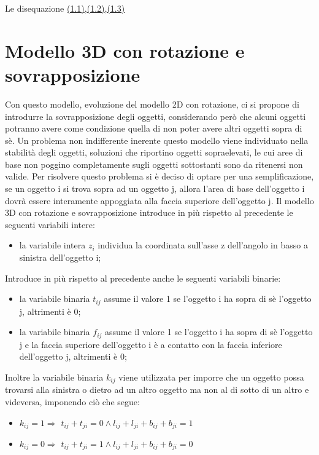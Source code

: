 Le disequazione \hyperlink{(1.1)}{(1.1)},\hyperlink{(1.2)}{(1.2)},\hyperlink{(1.3)}{(1.3)}  

\section{Modello 3D con rotazione e sovrapposizione}
Con questo modello, evoluzione del modello 2D con rotazione, ci si propone di introdurre la sovrapposizione degli oggetti, considerando però che alcuni oggetti potranno avere come condizione quella di non poter avere altri oggetti sopra di sè. Un problema non indifferente inerente questo modello viene individuato nella stabilità degli oggetti, soluzioni che riportino oggetti sopraelevati, le cui aree di base non poggino completamente sugli oggetti sottostanti sono da ritenersi non valide. Per risolvere questo problema si è deciso di optare per una semplificazione, se un oggetto i si trova sopra ad un oggetto j, allora l'area di base dell'oggetto i dovrà essere interamente appoggiata alla faccia superiore dell'oggetto j.
Il modello 3D con rotazione e sovrapposizione introduce in più rispetto al precedente le seguenti variabili intere:
\begin{itemize}
	\item la variabile intera $z_{i}$ individua la coordinata sull'asse z dell'angolo in basso a sinistra dell'oggetto i;
\end{itemize}
Introduce in più rispetto al precedente anche le seguenti variabili binarie:
\begin{itemize}
	\item la variabile binaria $t_{ij}$ assume il valore 1 se l'oggetto i ha sopra di sè l'oggetto j, altrimenti è 0;
	\item la variabile binaria $f_{ij}$ assume il valore 1 se l'oggetto i ha sopra di sè l'oggetto j e la faccia superiore dell'oggetto i è a contatto con la faccia inferiore dell'oggetto j, altrimenti è 0;
\end{itemize}
Inoltre la variabile binaria $k_{ij}$ viene utilizzata per imporre che un oggetto possa trovarsi alla sinistra o dietro ad un altro oggetto ma non al di sotto di un altro e videversa, imponendo ciò che segue:
\begin{itemize}
	\item \textbf{$k_{ij} = 1 \Rightarrow$} $t_{ij} + t_{ji} = 0 \land l_{ij} + l_{ji} + b_{ij} + b_{ji} = 1$
	\item \textbf{$k_{ij} = 0 \Rightarrow$} $t_{ij} + t_{ji} = 1 \land l_{ij} + l_{ji} + b_{ij} + b_{ji}= 0$
\end{itemize}


